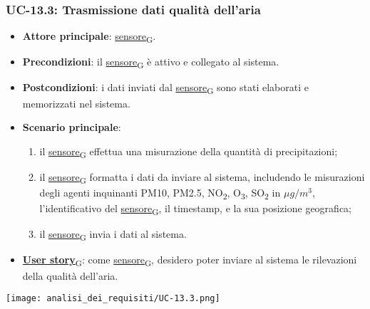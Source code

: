 \subsubsection{UC-13.3: Trasmissione dati qualità dell'aria}
\begin{itemize}
	\item \textbf{Attore principale}: \href{https://7last.github.io/docs/pb/documentazione-interna/glossario\#sensore}{sensore\textsubscript{G}}.
	\item \textbf{Precondizioni}: il \href{https://7last.github.io/docs/pb/documentazione-interna/glossario\#sensore}{sensore\textsubscript{G}} è attivo e collegato al sistema.
	\item \textbf{Postcondizioni}: i dati inviati dal \href{https://7last.github.io/docs/pb/documentazione-interna/glossario\#sensore}{sensore\textsubscript{G}} sono stati elaborati e memorizzati nel sistema.
	\item \textbf{Scenario principale}:
	      \begin{enumerate}
		      \item il \href{https://7last.github.io/docs/pb/documentazione-interna/glossario\#sensore}{sensore\textsubscript{G}} effettua una misurazione della quantità di precipitazioni;
		      \item il \href{https://7last.github.io/docs/pb/documentazione-interna/glossario\#sensore}{sensore\textsubscript{G}} formatta i dati da inviare al sistema, includendo le misurazioni degli agenti inquinanti PM10, PM2.5, NO\textsubscript{2}, O\textsubscript{3}, SO\textsubscript{2}
		            in $\mu g/m^3$, l'identificativo del \href{https://7last.github.io/docs/pb/documentazione-interna/glossario\#sensore}{sensore\textsubscript{G}}, il timestamp, e la sua posizione geografica;
		      \item il \href{https://7last.github.io/docs/pb/documentazione-interna/glossario\#sensore}{sensore\textsubscript{G}} invia i dati al sistema.
	      \end{enumerate}
	\item \href{https://7last.github.io/docs/pb/documentazione-interna/glossario\#user-story}{\textbf{User story}\textsubscript{G}}:
	      come \href{https://7last.github.io/docs/pb/documentazione-interna/glossario\#sensore}{sensore\textsubscript{G}}, desidero poter inviare al sistema le rilevazioni della qualità dell'aria.
\end{itemize}

\begin{center}
	\texttt{[image: analisi\_dei\_requisiti/UC-13.3.png]}
\end{center}

